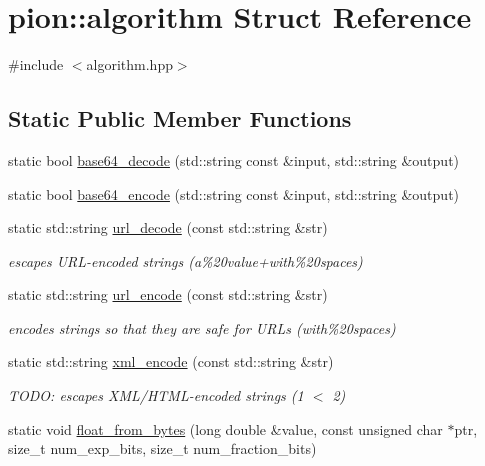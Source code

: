 \hypertarget{structpion_1_1algorithm}{\section{pion\-:\-:algorithm Struct Reference}
\label{structpion_1_1algorithm}
}


{\ttfamily \#include $<$algorithm.\-hpp$>$}

\subsection*{Static Public Member Functions}
\begin{DoxyCompactItemize}
\item 
static bool \hyperlink{structpion_1_1algorithm_ad1700ce7cf8e29bb7600d5729fd4cdad}{base64\-\_\-decode} (std\-::string const \&input, std\-::string \&output)
\item 
static bool \hyperlink{structpion_1_1algorithm_ae5f52e52ac349ecf20410f2ad3e257dd}{base64\-\_\-encode} (std\-::string const \&input, std\-::string \&output)
\item 
static std\-::string \hyperlink{structpion_1_1algorithm_a440bd54b07a24c80bc939fdb03583721}{url\-\_\-decode} (const std\-::string \&str)
\begin{DoxyCompactList}\small\item\em escapes U\-R\-L-\/encoded strings (a\%20value+with\%20spaces) \end{DoxyCompactList}\item 
static std\-::string \hyperlink{structpion_1_1algorithm_aa4eaedaecac95a638cedf5c4884de1b8}{url\-\_\-encode} (const std\-::string \&str)
\begin{DoxyCompactList}\small\item\em encodes strings so that they are safe for U\-R\-Ls (with\%20spaces) \end{DoxyCompactList}\item 
static std\-::string \hyperlink{structpion_1_1algorithm_a2177ca0d0f01e6ef6d4d3bceb73d82bb}{xml\-\_\-encode} (const std\-::string \&str)
\begin{DoxyCompactList}\small\item\em T\-O\-D\-O\-: escapes X\-M\-L/\-H\-T\-M\-L-\/encoded strings (1 $<$ 2) \end{DoxyCompactList}\item 
static void \hyperlink{structpion_1_1algorithm_ab3cce74846661c3585ec5f540a99ff07}{float\-\_\-from\-\_\-bytes} (long double \&value, const unsigned char $\ast$ptr, size\-\_\-t num\-\_\-exp\-\_\-bits, size\-\_\-t num\-\_\-fraction\-\_\-bits)

\end{DoxyCompactItemize}
